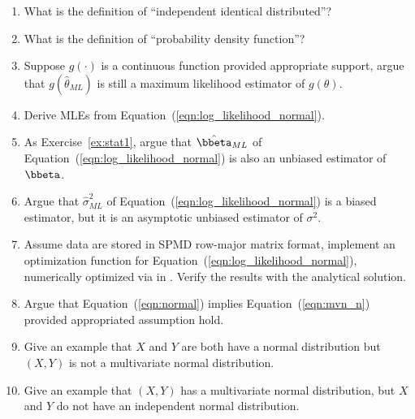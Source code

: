 \begin{enumerate}[label=\thechapter-\arabic*]

\item
What is the definition of ``independent identical distributed''?

\item
What is the definition of ``probability density function''?

\item
Suppose $g(\cdot)$ is a continuous function provided appropriate support,
argue that $g\left(\hat{\theta}_{ML}\right)$ is still a maximum likelihood
estimator of $g(\theta)$.

\item
Derive MLEs from Equation~(\ref{eqn:log_likelihood_normal}).

\item
As Exercise~\ref{ex:stat1},
argue that $\hat{\bbeta}_{ML}$ of
Equation~(\ref{eqn:log_likelihood_normal}) is also
an unbiased estimator of $\bbeta$.

\item
Argue that $\hat{\sigma}^2_{ML}$ of
Equation~(\ref{eqn:log_likelihood_normal})
is a biased estimator, but it is an asymptotic
unbiased estimator of $\sigma^2$.

\item
Assume data are stored in SPMD row-major matrix format,
implement an optimization function for
Equation~(\ref{eqn:log_likelihood_normal}), numerically optimized via
 in .
Verify the results with the analytical solution.

\item
Argue that Equation~(\ref{eqn:normal}) implies Equation~(\ref{eqn:mvn_n})
provided appropriated assumption hold.

\item
Give an example that $X$ and $Y$ are both have a normal distribution
but $(X, Y)$ is not a multivariate normal distribution.

\item
Give an example that $(X, Y)$ has a multivariate normal distribution,
but $X$ and $Y$ do not have an independent normal distribution.

\end{enumerate}



